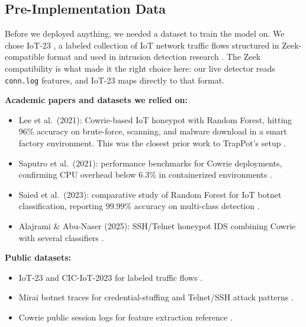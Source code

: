 \subsection{Pre-Implementation Data}
\label{subsec:pre_implementation_data}

Before we deployed anything, we needed a dataset to train the model on. We chose IoT-23 \cite{iot23dataset}, a labeled collection of IoT network traffic flows structured in Zeek-compatible format and used in intrusion detection research \cite{dekeersmaeker2023survey,alex2023comprehensive}. The Zeek compatibility is what made it the right choice here: our live detector reads \texttt{conn.log} features, and IoT-23 maps directly to that format.

\textbf{Academic papers and datasets we relied on:}

\begin{itemize}
\item Lee et al.\ (2021): Cowrie-based IoT honeypot with Random Forest, hitting 96\% accuracy on brute-force, scanning, and malware download in a smart factory environment. This was the closest prior work to TrapPot's setup \cite{lee2021classification}.
\item Saputro et al.\ (2021): performance benchmarks for Cowrie deployments, confirming CPU overhead below 6.3\% in containerized environments \cite{9359711}.
\item Saied et al.\ (2023): comparative study of Random Forest for IoT botnet classification, reporting 99.99\% accuracy on multi-class detection \cite{saied2023comparative}.
\item Alajrami \& Abu-Naser (2025): SSH/Telnet honeypot IDS combining Cowrie with several classifiers \cite{alajrami2025aipowered}.
\end{itemize}

\textbf{Public datasets:}

\begin{itemize}
\item IoT-23 and CIC-IoT-2023 for labeled traffic flows \cite{iot23dataset,dekeersmaeker2023survey,christy2024iot}.
\item Mirai botnet traces for credential-stuffing and Telnet/SSH attack patterns \cite{203628,famera2025mirai}.
\item Cowrie public session logs for feature extraction reference \cite{9071014,9558948}.
\end{itemize}

